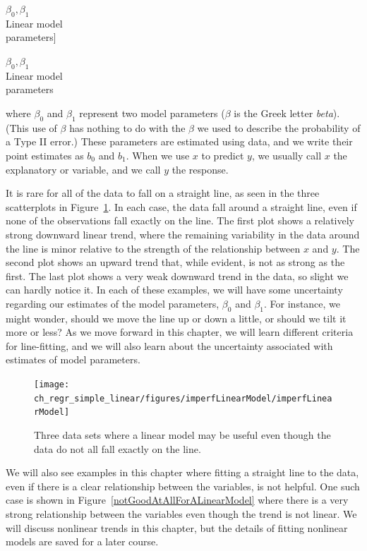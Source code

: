 $\beta_0, \beta_1$\vspace{0.7mm}\\\footnotesize Linear model\\ parameters]{\raggedright\vspace{-10mm}

$\beta_0, \beta_1$\vspace{0.7mm}\\\footnotesize Linear model\\ parameters}where $\beta_0$ and $\beta_1$ represent two model parameters ($\beta$ is the Greek letter \emph{beta}). (This use of $\beta$ has nothing to do with the $\beta$ we used to describe the probability of a Type II error.) These parameters are estimated using data, and we write their point estimates as $b_0$ and $b_1$. When we use $x$ to predict $y$, we usually call $x$ the explanatory or  variable, and we call $y$ the response.

It is rare for all of the data to fall on a straight line, as seen in the three scatterplots in Figure~\ref{imperfLinearModel}. In each case, the data fall around a straight line, even if none of the observations fall exactly on the line. The first plot shows a relatively strong downward linear trend, where the remaining variability in the data around the line is minor relative to the strength of the relationship between $x$ and $y$. The second plot shows an upward trend that, while evident, is not as strong as the first. The last plot shows a very weak downward trend in the data, so slight we can hardly notice it. In each of these examples, we will have some uncertainty regarding our estimates of the model parameters, $\beta_0$ and $\beta_1$. For instance, we might wonder, should we move the line up or down a little, or should we tilt it more or less? As we move forward in this chapter, we will learn different criteria for line-fitting, and we will also learn about the uncertainty associated with estimates of model parameters.

\begin{figure}
   \centering
   \texttt{[image: ch\_regr\_simple\_linear/figures/imperfLinearModel/imperfLinearModel]}
   \caption{Three data sets where a linear model may be useful even though the data do not all fall exactly on the line.}
   \label{imperfLinearModel}
\end{figure}

We will also see examples in this chapter where fitting a straight line to the data, even if there is a clear relationship between the variables, is not helpful. One such case is shown in Figure~\ref{notGoodAtAllForALinearModel} where there is a very strong relationship between the variables even though the trend is not linear. We will discuss nonlinear trends in this chapter, but the details of fitting nonlinear models are saved for a later course.

